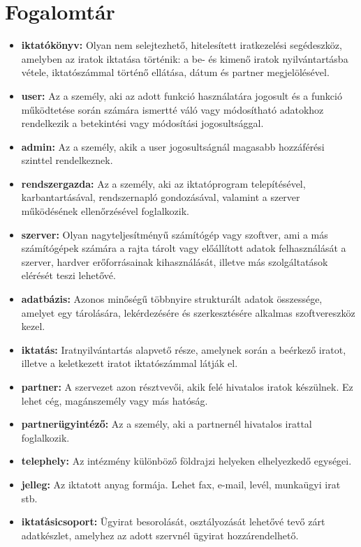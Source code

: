 \documentclass[
]{thesis-ekf}
\theoremstyle{definition}
\theoremstyle{remark}
\begin{document}
\section{Fogalomtár}
\begin{itemize}[leftmargin=0pt]
 	\item[] \textbf{iktatókönyv:} Olyan nem selejtezhető, hitelesített iratkezelési segédeszköz, amelyben az iratok iktatása történik: a be- és kimenő iratok nyilvántartásba vétele, iktatószámmal történő ellátása, dátum és partner megjelölésével.
	\item[] \textbf{user:}  Az a személy, aki az adott funkció használatára jogosult és a funkció működtetése során számára ismertté váló vagy módosítható adatokhoz rendelkezik a betekintési vagy módosítási jogosultsággal.
	\item[] \textbf{admin:} Az a személy, akik a user jogosultságnál magasabb hozzáférési szinttel rendelkeznek.
	\item[] \textbf{rendszergazda:} Az a személy, aki az iktatóprogram telepítésével, karbantartásával, rendszernapló gondozásával, valamint a szerver működésének ellenőrzésével foglalkozik.
	\item[] \textbf{szerver: }Olyan nagyteljesítményű számítógép vagy szoftver, ami a más számítógépek számára a rajta tárolt vagy előállított adatok felhasználását a szerver, hardver erőforrásainak kihasználását, illetve más szolgáltatások elérését teszi lehetővé.
	\item[] \textbf{adatbázis: }Azonos minőségű többnyire strukturált adatok összessége, amelyet egy tárolására, lekérdezésére és szerkesztésére alkalmas szoftvereszköz kezel.
	\item[] \textbf{iktatás: }Iratnyilvántartás alapvető része, amelynek során a beérkező iratot, illetve a keletkezett iratot iktatószámmal látják el.
	\item[] \textbf{partner: }A szervezet azon résztvevői, akik felé hivatalos iratok készülnek. Ez lehet cég, magánszemély vagy más hatóság.
	\item[] \textbf{partnerügyintéző: }Az a személy, aki a partnernél hivatalos irattal foglalkozik.
	\item[] \textbf{telephely: }Az intézmény különböző földrajzi helyeken elhelyezkedő egységei.
	\item[] \textbf{jelleg: }Az iktatott anyag formája. Lehet fax, e-mail, levél, munkaügyi irat stb.
	\item[] \textbf{iktatásicsoport: }Ügyirat besorolását, osztályozását lehetővé tevő zárt adatkészlet, amelyhez az adott szervnél ügyirat hozzárendelhető.

\end{itemize}
\end{document}
